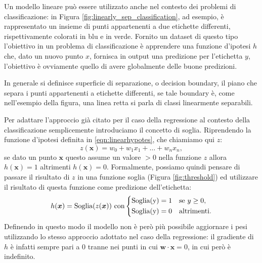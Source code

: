 \documentclass[../../main.tex]{subfiles}
\begin{document}
    Un modello lineare può essere utilizzato anche nel contesto dei problemi di classificazione: in Figura \ref{fig:linearly_sep_classification}, ad esempio,  è rappresentato un insieme di punti appartenenti a due etichette differenti, rispettivamente colorati in blu e in verde. Fornito un dataset di questo tipo l'obiettivo in un problema di classificazione è apprendere una funzione d'ipotesi $h$ che, dato un nuovo punto $x$, fornisca in output una predizione per l'etichetta $y$, l'obiettivo è ovviamente quello di avere globalmente delle buone predizioni. 
    
    In generale si definisce superficie di separazione, o decision boundary, il piano che separa i punti appartenenti a etichette differenti, se tale boundary è, come nell'esempio della figura, una linea retta si parla di classi linearmente separabili. 
    
    Per adattare l'approccio già citato per il caso della regressione al contesto della classificazione semplicemente introduciamo il concetto di soglia. Riprendendo la funzione d'ipotesi definita in \eqref{eqn:linearhypotes}, che chiamiamo qui $z$:
    \[z(\boldsymbol{x}) = w_0 + w_1x_1 + \dots + w_nx_n,\]
    se dato un punto $\boldsymbol{x}$ questo assume un valore $> 0$ nella funzione $z$ allora $h(\boldsymbol{x}) = 1$ altrimenti $h(\boldsymbol{x}) = 0$. Formalmente, possiamo quindi pensare di passare il risultato di $z$ in una funzione soglia (Figura \ref{fig:threshold}) ed utilizzare il risultato di questa funzione come predizione dell'etichetta:
    \[h(\boldsymbol{x}) = \text{Soglia}(z(\boldsymbol{x})) \ \text{con} 
    \begin{dcases}
        \text{Soglia(y)} = 1 & \text{se} \ y \geq 0, \\
        \text{Soglia(y)} = 0 & \text{altrimenti}. \\
    \end{dcases}\]
    Definendo in questo modo il modello non è però più possibile aggiornare i pesi utilizzando lo stesso approccio adottato nel caso della regressione: il gradiente di $h$ è infatti sempre pari a 0 tranne nei punti in cui $\boldsymbol{w} \cdot \boldsymbol{x} = 0$, in cui però è indefinito.
    
\end{document}
